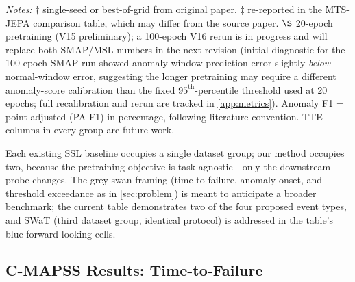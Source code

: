 \documentclass{article}
\newcommand{\plannedc}[1]{{\color{blue}#1}}
\newcommand{\plannedc}[1]{#1}
\begin{document}
\begin{table}[t]
\vspace{2pt}
{\footnotesize\raggedright\textit{Notes:} $\dagger$ single-seed or best-of-grid from original paper. $\ddagger$ re-reported in the MTS-JEPA comparison table, which may differ from the source paper. $\S$ 20-epoch pretraining (V15 preliminary); \plannedc{a 100-epoch V16 rerun is in progress and will replace both SMAP/MSL numbers in the next revision (initial diagnostic for the 100-epoch SMAP run showed anomaly-window prediction error slightly \emph{below} normal-window error, suggesting the longer pretraining may require a different anomaly-score calibration than the fixed $95^\text{th}$-percentile threshold used at 20 epochs; full recalibration and rerun are tracked in \cref{app:metrics}).} Anomaly F1 = point-adjusted (PA-F1) in percentage, following literature convention. TTE columns in every group are future work. \par}
\end{table}

Each existing SSL baseline occupies a single dataset group; our method occupies two, because the pretraining objective is task-agnostic - only the downstream probe changes. The grey-swan framing (time-to-failure, anomaly onset, and threshold exceedance as in \cref{sec:problem}) is meant to anticipate a broader benchmark; the current table demonstrates two of the four proposed event types, and SWaT (third dataset group, identical protocol) is addressed in the table's blue forward-looking cells.

\subsection{C-MAPSS Results: Time-to-Failure}
\label{sec:rul_results}
\end{document}
